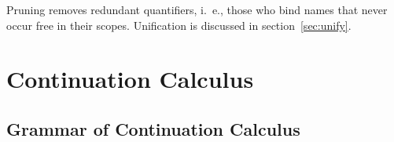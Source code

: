 \documentclass{amsart}
\begin{document}
\nc{}

\nc{}

\nc{}

\nc{}

\nc{}

\Tautology

%

\SuperIntroduction

\SuperElimination

Pruning removes redundant quantifiers, i.~e., those who bind
names that never occur free in their scopes. Unification is
discussed in section~\ref{sec:unify}.

\UniversalIntroduction

\ExistentialIntroduction

\section{Continuation Calculus}

\subsection{Grammar of Continuation Calculus}

\nc{}
\end{document}
